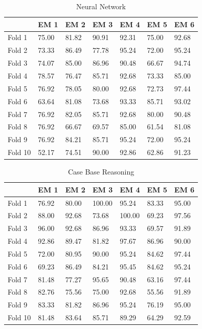 \documentclass[a4paper,12pt,oneside,final]{report}
\begin{document}
\begin{enumerate}
\begin{itemize}
\begin{table} [H]
\begin{center}
\begin{tabular}{l|llllll}
       &  EM 1 & EM 2 & EM 3 & EM 4 & EM 5 & EM 6    \\ \hline
Fold 1 &  75.00 & 81.82 & 90.91 & 92.31 & 75.00 & 92.68    \\ 
Fold 2 &  73.33 & 86.49 & 77.78 & 95.24 & 72.00 & 95.24    \\ 
Fold 3 &  74.07 & 85.00 & 86.96 & 90.48 & 66.67 & 94.74   \\ 
Fold 4 &  78.57 & 76.47 & 85.71 & 92.68 & 73.33 & 85.00   \\ 
Fold 5 &  76.92 & 78.05 & 80.00 & 92.68 & 72.73 & 97.44   \\ 
Fold 6 &  63.64 & 81.08 & 73.68 & 93.33 & 85.71 & 93.02   \\ 
Fold 7 &  76.92 & 82.05 & 85.71 & 92.68 & 80.00 & 90.48   \\ 
Fold 8 &  76.92 & 66.67 & 69.57 & 85.00 & 61.54 & 81.08  \\ 
Fold 9 &  76.92 & 84.21 & 85.71 & 95.24 & 72.00 & 95.24   \\ 
Fold 10 &  52.17 & 74.51 & 90.00 & 92.86 & 62.86 & 91.23   \\ 
\end{tabular}
\caption{ Neural Network}
\end{center}
\end{table}


\begin{table} [H]
\begin{center}
\begin{tabular}{l|llllll}
       &  EM 1 & EM 2 & EM 3 & EM 4 & EM 5 & EM 6    \\ \hline
Fold 1 &  76.92 & 80.00 & 100.00 & 95.24 & 83.33 & 95.00   \\ 
Fold 2 &  88.00 & 92.68 & 73.68 & 100.00 & 69.23 & 97.56   \\ 
Fold 3 &  96.00 & 92.68 & 86.96 & 93.33 & 69.57 & 91.89   \\ 
Fold 4 &  92.86 & 89.47 & 81.82 & 97.67 & 86.96 & 90.00   \\ 
Fold 5 &  72.00 & 80.95 & 90.00 & 95.24 & 84.62 & 97.44   \\ 
Fold 6 &  69.23 & 86.49 & 84.21 & 95.45 & 84.62 & 95.24   \\ 
Fold 7 &  81.48 & 77.27 & 95.65 & 90.48 & 63.16 & 97.44   \\ 
Fold 8 & 82.76 & 75.56 & 75.00 & 92.68 & 55.56 & 91.89   \\ 
Fold 9 &  83.33 & 81.82 & 86.96 & 95.24 & 76.19 & 95.00   \\ 
Fold 10 &  81.48 & 83.64 & 85.71 & 89.29 & 64.29 & 92.59   \\ 
\end{tabular}
\caption{ Case Base Reasoning}
\end{center}
\end{table}


\end{itemize}
\end{enumerate}
\end{document}
